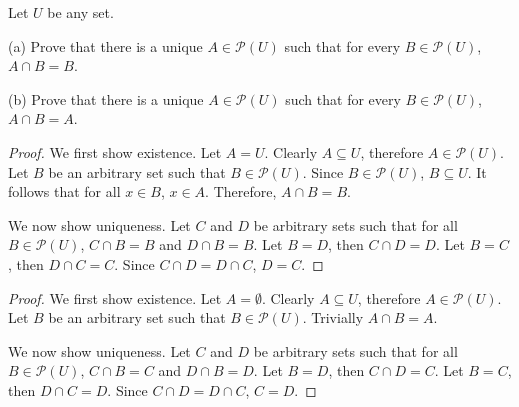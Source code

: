 \begin{tcolorbox}[title=Problem 7, breakable]
    Let $U$ be any set.

    (a) Prove that there is a unique $A \in \mathcal{P}(U)$
    such that for every $B \in \mathcal{P}(U)$, $A \cap B = B$.

    (b) Prove that there is a unique $A \in \mathcal{P}(U)$
    such that for every $B \in \mathcal{P}(U)$, $A \cap B = A$.
\end{tcolorbox}

\begin{proof}
    We first show existence. Let $A = U$. 
    Clearly $A \subseteq U$, 
    therefore $A \in \mathcal{P}(U)$.
    Let $B$ be an arbitrary set such that $B \in \mathcal{P}(U)$.
    Since $B \in \mathcal{P}(U)$, $B \subseteq U$.
    It follows that for all $x \in B$, $x \in A$.
    Therefore, $A \cap B = B$.

    We now show uniqueness. Let $C$ and $D$ be arbitrary sets such that for all $B
        \in \mathcal{P}(U)$, $C \cap B = B$ and $D \cap B = B$. Let $B = D$, then $C
        \cap D = D$. Let $B = C$, then $D \cap C = C$. Since $C \cap D = D \cap C$, $D
        = C$.
\end{proof}

\begin{proof}
    We first show existence.
    Let $A = \emptyset$. Clearly $A \subseteq U$,
    therefore $A \in \mathcal{P}(U)$.
    Let $B$ be an arbitrary set such that $B \in \mathcal{P}(U)$.
    Trivially $A \cap B = A$.

    We now show uniqueness. Let $C$ and $D$ be arbitrary sets such that for all $B
        \in \mathcal{P}(U)$, $C \cap B = C$ and $D \cap B = D$. Let $B = D$, then $C
        \cap D = C$. Let $B = C$, then $D \cap C = D$. Since $C \cap D = D \cap C$, $C
        = D$.
\end{proof}


